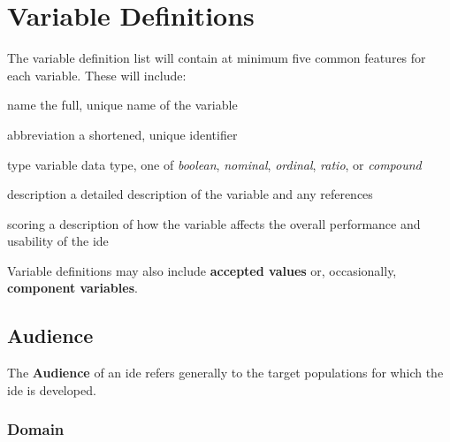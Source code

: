 \section{Variable Definitions}
\label{sec:definitions}

The variable definition list will contain at minimum five common features
for each variable. These will include:

\begin{AlignedDesc}
  \item[name] the full, unique name of the variable
  \item[abbreviation] a shortened, unique identifier
  \item[type] variable data type, one of \textit{boolean},
  \textit{nominal}, \textit{ordinal}, \textit{ratio}, or \textit{compound}
  \item[description] a detailed description of the variable and any
  references
  \item[scoring] a description of how the variable affects the overall
  performance and usability of the \ac{ide}
\end{AlignedDesc}

\noindent
Variable definitions may also include \textbf{accepted values} or,
occasionally, \textbf{component variables}.

\subsection{Audience}
\label{subsec:audience}

The \textbf{Audience} of an \ac{ide} refers generally to the target
populations for which the \ac{ide} is developed.

\subsubsection{Domain}
\label{subsubsec:domain}

